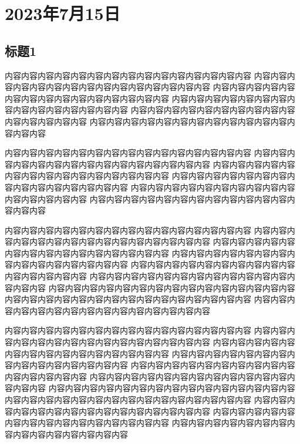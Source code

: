 \chapter*{2023年7月15日}
\section*{标题1}
\label{section:A}
内容内容内容内容内容内容内容内容内容内容内容内容内容内容内容
内容内容内容内容内容内容内容内容内容内容内容内容内容内容内容
内容内容内容内容内容内容内容内容内容内容内容内容内容内容内容
内容内容内容内容内容内容内容内容内容内容内容内容内容内容内容
内容内容内容内容内容内容内容内容内容内容内容内容内容内容内容
内容内容内容内容内容内容内容内容内容内容内容内容内容内容内容

内容内容内容内容内容内容内容内容内容内容内容内容内容内容内容
内容内容内容内容内容内容内容内容内容内容内容内容内容内容内容
内容内容内容内容内容内容内容内容内容内容内容内容内容内容内容
内容内容内容内容内容内容内容内容内容内容内容内容内容内容内容
内容内容内容内容内容内容内容内容内容内容内容内容内容内容内容
内容内容内容内容内容内容内容内容内容内容内容内容内容内容内容

内容内容内容内容内容内容内容内容内容内容内容内容内容内容内容
内容内容内容内容内容内容内容内容内容内容内容内容内容内容内容
内容内容内容内容内容内容内容内容内容内容内容内容内容内容内容
内容内容内容内容内容内容内容内容内容内容内容内容内容内容内容
内容内容内容内容内容内容内容内容内容内容内容内容内容内容内容
内容内容内容内容内容内容内容内容内容内容内容内容内容内容内容
内容内容内容内容内容内容内容内容内容内容内容内容内容内容内容
内容内容内容内容内容内容内容内容内容内容内容内容内容内容内容
内容内容内容内容内容内容内容内容内容内容内容内容内容内容内容

内容内容内容内容内容内容内容内容内容内容内容内容内容内容内容
内容内容内容内容内容内容内容内容内容内容内容内容内容内容内容
内容内容内容内容内容内容内容内容内容内容内容内容内容内容内容
内容内容内容内容内容内容内容内容内容内容内容内容内容内容内容
内容内容内容内容内容内容内容内容内容内容内容内容内容内容内容
内容内容内容内容内容内容内容内容内容内容内容内容内容内容内容
内容内容内容内容内容内容内容内容内容内容内容内容内容内容内容
内容内容内容内容内容内容内容内容内容内容内容内容内容内容内容
内容内容内容内容内容内容内容内容内容内容内容内容内容内容内容
内容内容内容内容内容内容内容内容内容内容内容内容内容内容内容
内容内容内容内容内容内容内容内容内容内容内容内容内容内容内容